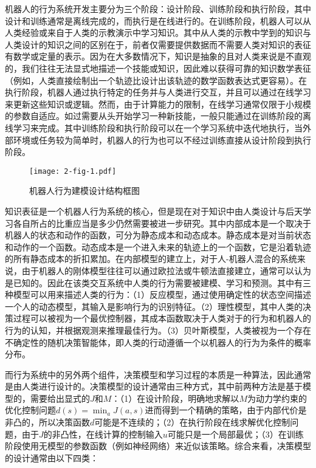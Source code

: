 机器人的行为系统开发主要分为三个阶段：设计阶段、训练阶段和执行阶段，其中设计和训练通常是离线完成的，而执行是在线进行的。在训练阶段，机器人可以从人类经验或来自于人类的示教演示中学习知识。其中从人类的示教中学到的知识与人类设计的知识之间的区别在于，前者仅需要提供数据而不需要人类对知识的表征有数学或定量的表示。因为在大多数情况下，知识是抽象的且对人类来说是不直观的，我们往往无法显式地描述一个技能或知识，因此难以获得可靠的知识数学表征（例如，人类直接绘制出一个轨迹比设计出该轨迹的数学函数表达式更容易）。在执行阶段，机器人通过执行特定的任务并与人类进行交互，并且可以通过在线学习来更新这些知识或逻辑。然而，由于计算能力的限制，在线学习通常仅限于小规模的参数自适应。如过需要从头开始学习一种新技能，一般只能通过在训练阶段的离线学习来完成。其中训练阶段和执行阶段可以在一个学习系统中迭代地执行，当外部环境或任务较为简单时，机器人的行为也可以不经过训练直接从设计阶段到执行阶段。

\begin{figure}[h]
    \centering
    \texttt{[image: 2-fig-1.pdf]}
    \caption{机器人行为建模设计结构框图}
    \label{fig:2-1}
\end{figure}
知识表征是一个机器人行为系统的核心，但是现在对于知识中由人类设计与后天学习各自所占的比重应当是多少仍然需要被进一步研究。其中内部成本是一个取决于机器人的状态和动作的函数，可分为静态成本和动态成本。静态成本是对当前状态和动作的一个函数。动态成本是一个进入未来的轨迹上的一个函数，它是沿着轨迹的所有静态成本的折扣累加。在内部模型的建立上，对于人-机器人混合的系统来说，由于机器人的刚体模型往往可以通过欧拉法或牛顿法直接建立，通常可以认为是已知的。因此在该类交互系统中人类的行为需要被建模、学习和预测\cite{liuDesigningRobotBehavior,araiAssessmentOperatorStress2010,xinxuHumanBehaviorUnderstanding2010}。其中有三种模型可以用来描述人类的行为：（1）反应模型，通过使用确定性的状态空间描述一个人的动态模型，其输入是影响行为的识别特征。（2）理性模型，其中人类的决策过程可以被视为一个最优控制器，其成本函数取决于人类对于的行为和机器人的行为的认知，并根据观测来推理最佳行为。（3）贝叶斯模型，人类被视为一个存在不确定性的随机决策智能体，即人类的行动遵循一个以机器人的行为为条件的概率分布。

而行为系统中的另外两个组件，决策模型和学习过程的本质是一种算法，因此通常是由人类进行设计的。决策模型的设计通常由三种方式，其中前两种方法是基于模型的，需要给出显式的$J$和$M$：（1）在设计阶段，明确地求解以$M$为动力学约束的优化控制问题$d(s)=\min_a J(a,s)$进而得到一个精确的策略，由于内部代价是非凸的，所以决策函数$d$可能是不连续的；（2）在执行阶段在线求解优化控制问题，由于$J$的非凸性，在线计算的控制输入$u$可能只是一个局部最优；（3）在训练阶段使用无模型的参数函数（例如神经网络）来近似该策略。综合来看，决策模型的设计通常由以下四类：

